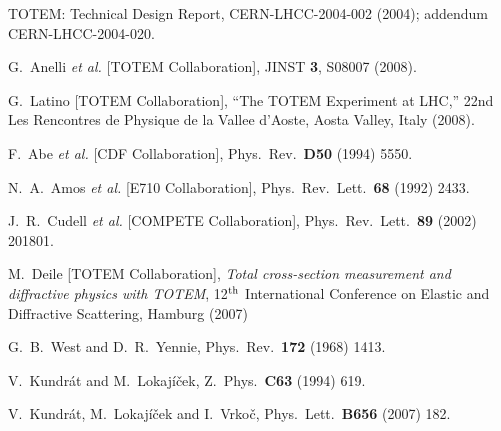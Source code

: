 \documentclass{cimento}
\begin{document}
\begin{footnotesize}
\begin{thebibliography}{99}

	TOTEM: Technical Design Report, CERN-LHCC-2004-002 (2004); addendum CERN-LHCC-2004-020.

  G.~Anelli {\it et al.}  [TOTEM Collaboration],
  JINST {\bf 3}, S08007 (2008).

  G.~Latino  [TOTEM Collaboration],
  ``The TOTEM Experiment at LHC,''
  22nd Les Rencontres de Physique de la Vallee d'Aoste, Aosta Valley, Italy (2008).

  F.~Abe {\it et al.}  [CDF Collaboration],
  Phys.\ Rev.\  {\bf D50} (1994) 5550.

  N.~A.~Amos {\it et al.}  [E710 Collaboration],
  Phys.\ Rev.\ Lett.\  {\bf 68} (1992) 2433.

  J.~R.~Cudell {\it et al.}  [COMPETE Collaboration],
  Phys.\ Rev.\ Lett.\  {\bf 89} (2002) 201801.

	M.~Deile  [TOTEM Collaboration],
	{\it Total cross-section measurement and diffractive physics with TOTEM},
	12$^{\rm th}$ International Conference on Elastic and Diffractive Scattering,
	Hamburg (2007)

  G.~B.~West and D.~R.~Yennie,
  Phys.\ Rev.\  {\bf 172} (1968) 1413.

  V.~Kundr\' at and M.~Lokaj\' i\v cek,
  Z.\ Phys.\ {\bf C63} (1994) 619.

  V.~Kundr\' at, M.~Lokaj\' i\v cek and I.~Vrko\v c,
  Phys.\ Lett.\ {\bf B656} (2007) 182.


\end{thebibliography}
\end{footnotesize}
\end{document}
